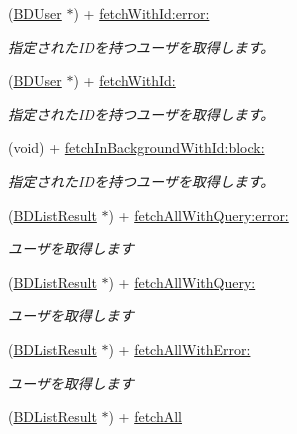 \begin{DoxyCompactItemize}
\item 
(\hyperlink{interface_b_d_user}{B\-D\-User} $\ast$) + \hyperlink{interface_b_d_user_a5d2d45bd4ff7e75ca443ed7962b5bc4e}{fetch\-With\-Id\-:error\-:}
\begin{DoxyCompactList}\small\item\em 指定された\-I\-Dを持つユーザを取得します。 \end{DoxyCompactList}\item 
(\hyperlink{interface_b_d_user}{B\-D\-User} $\ast$) + \hyperlink{interface_b_d_user_aa69faa54bce830c2519854b9b74c5ace}{fetch\-With\-Id\-:}
\begin{DoxyCompactList}\small\item\em 指定された\-I\-Dを持つユーザを取得します。 \end{DoxyCompactList}\item 
(void) + \hyperlink{interface_b_d_user_a6837bc9c918718e81ff70c861660c923}{fetch\-In\-Background\-With\-Id\-:block\-:}
\begin{DoxyCompactList}\small\item\em 指定された\-I\-Dを持つユーザを取得します。 \end{DoxyCompactList}\item 
(\hyperlink{interface_b_d_list_result}{B\-D\-List\-Result} $\ast$) + \hyperlink{interface_b_d_user_a5518607b1fd758a57fba44fa8ee0bcb0}{fetch\-All\-With\-Query\-:error\-:}
\begin{DoxyCompactList}\small\item\em ユーザを取得します \end{DoxyCompactList}\item 
(\hyperlink{interface_b_d_list_result}{B\-D\-List\-Result} $\ast$) + \hyperlink{interface_b_d_user_a72818cdbdb69fad19eea5ca43136984b}{fetch\-All\-With\-Query\-:}
\begin{DoxyCompactList}\small\item\em ユーザを取得します \end{DoxyCompactList}\item 
(\hyperlink{interface_b_d_list_result}{B\-D\-List\-Result} $\ast$) + \hyperlink{interface_b_d_user_a21903a59a77a90705ccf20f1e61d870a}{fetch\-All\-With\-Error\-:}
\begin{DoxyCompactList}\small\item\em ユーザを取得します \end{DoxyCompactList}\item 
(\hyperlink{interface_b_d_list_result}{B\-D\-List\-Result} $\ast$) + \hyperlink{interface_b_d_user_af14cea1b76d895f3bb37bd236815ed5f}{fetch\-All}

\end{DoxyCompactItemize}
